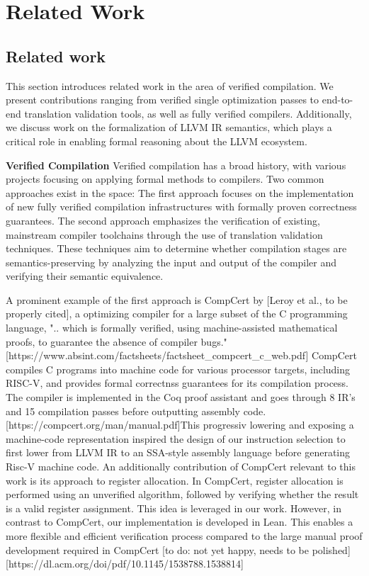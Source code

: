 \chapter{Related Work }

\section {Related work}
This section introduces related work in the area of verified compilation. We present contributions ranging from verified single optimization passes to end-to-end translation validation tools, as well as fully verified compilers. Additionally, we discuss work on the formalization of LLVM IR semantics, which plays a critical role in enabling formal reasoning about the LLVM ecosystem. 

\textbf{Verified Compilation}
Verified compilation has a broad history, with various projects focusing on applying formal methods to compilers. Two common approaches exist in the space: The first approach focuses on the implementation of new fully verified compilation infrastructures with formally proven correctness guarantees. The second approach emphasizes the verification of existing, mainstream compiler toolchains through the use of translation validation techniques. These techniques aim to determine whether compilation stages are semantics-preserving by analyzing the input and output of the compiler and verifying their semantic equivalence.

A prominent example of the first approach is CompCert by [Leroy et al., to be properly cited], a optimizing compiler for a large subset of the C programming language, ".. which is formally verified, using machine-assisted mathematical proofs, to guarantee the absence of compiler bugs." [https://www.absint.com/factsheets/factsheet_compcert_c_web.pdf] CompCert compiles C programs into machine code for various processor targets, including RISC-V, and provides formal correctnss guarantees for its compilation process. The compiler is implemented in the Coq proof assistant and goes through 8 IR's and 15 compilation passes before outputting assembly code.
[https://compcert.org/man/manual.pdf]This progressiv lowering and exposing a machine-code representation inspired the design of our instruction selection to first lower from LLVM IR to an SSA-style assembly language before generating Risc-V machine code. An additionally  contribution of CompCert relevant to this work is its approach to register allocation. In CompCert, register allocation is performed using an unverified algorithm, followed by verifying whether the result is a valid register assignment. This idea is leveraged in our work. However, in contrast to CompCert, our implementation is developed in Lean. This enables a more flexible and efficient verification process compared to the large manual proof development required in CompCert
[to do: not yet happy, needs to be polished]
[https://dl.acm.org/doi/pdf/10.1145/1538788.1538814]

